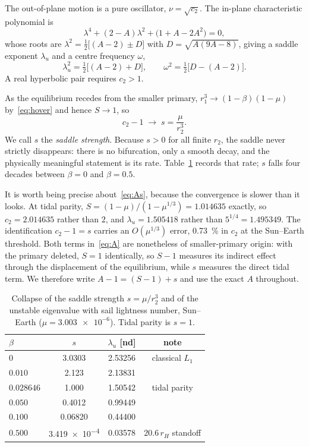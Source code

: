 \documentclass[11pt,a4paper]{article}
\begin{document}
The out-of-plane motion is a pure oscillator, $\nu=\sqrt{c_2}$. The in-plane
characteristic polynomial is
\begin{equation}
  \lambda^{4} + (2-A)\lambda^{2} + \bigl(1+A-2A^{2}\bigr) = 0 ,
  \label{eq:quartic}
\end{equation}
whose roots are $\lambda^{2}=\tfrac12\bigl[(A-2)\pm D\bigr]$ with
$D=\sqrt{A(9A-8)}$, giving a saddle exponent $\lambda_u$ and a centre frequency
$\omega$,
\begin{equation}
  \lambda_u^{2} = \tfrac12\bigl[(A-2)+D\bigr], \qquad
  \omega^{2} = \tfrac12\bigl[D-(A-2)\bigr].
  \label{eq:rates}
\end{equation}
A real hyperbolic pair requires $c_2>1$.

As the equilibrium recedes from the smaller primary, $r_1^3\to(1-\beta)(1-\mu)$
by~\eqref{eq:hover} and hence $S\to1$, so
\begin{equation}
  c_2 - 1 \;\longrightarrow\; s = \frac{\mu}{r_2^{3}} .
  \label{eq:As}
\end{equation}
We call $s$ the \emph{saddle strength}. Because $s>0$ for all finite $r_2$, the
saddle never strictly disappears: there is no bifurcation, only a smooth decay,
and the physically meaningful statement is its rate. Table~\ref{tab:collapse}
records that rate; $s$ falls four decades between $\beta=0$ and $\beta=0.5$.

It is worth being precise about~\eqref{eq:As}, because the convergence is slower
than it looks. At tidal parity, $S=(1-\mu)/(1-\mu^{1/3})=1.014635$ exactly, so
$c_2=2.014635$ rather than $2$, and $\lambda_u=1.505418$ rather than
$5^{1/4}=1.495349$. The identification $c_2-1=s$ carries an $O(\mu^{1/3})$ error,
\SI{0.73}{\percent} in $c_2$ at the Sun--Earth threshold. Both terms
in~\eqref{eq:A} are nonetheless of smaller-primary origin: with the primary
deleted, $S=1$ identically, so $S-1$ measures its indirect effect through the
displacement of the equilibrium, while $s$ measures the direct tidal term. We
therefore write $A-1=(S-1)+s$ and use the exact $A$ throughout.

\begin{table}[t]
  \centering
  \caption{Collapse of the saddle strength $s=\mu/r_2^{3}$ and of the unstable
  eigenvalue with sail lightness number, Sun--Earth
  ($\mu=\num{3.003e-6}$). Tidal parity is $s=1$.}
  \label{tab:collapse}
  \begin{tabular}{lccc}
    \toprule
    $\beta$ & $s$ & $\lambda_u$ [nd] & note \\
    \midrule
    $0$        & \num{3.0303}   & \num{2.53256} & classical $L_1$ \\
    $0.010$    & \num{2.123}    & \num{2.13831} & \\
    $0.028646$ & \num{1.000}    & \num{1.50542} & tidal parity \\
    $0.050$    & \num{0.4012}   & \num{0.99449} & \\
    $0.100$    & \num{0.06820}  & \num{0.44400} & \\
    $0.500$    & \num{3.419e-4} & \num{0.03578} & $20.6\,r_H$ standoff \\
    \bottomrule
  \end{tabular}
\end{table}
\end{document}
